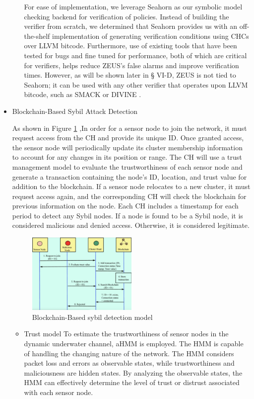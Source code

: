 \begin{itemize}
\begin{itemize}
    \hfill

For ease of implementation, we leverage Seahorn as our symbolic model checking backend for verification of policies. Instead of building the verifier from scratch, we determined that Seahorn provides us with an off-the-shelf implementation of generating 	verification conditions using \ac{CHC}s over \ac{LLVM} bitcode. Furthermore, use of existing tools that have been tested for bugs and fine tuned for performance, both of which are critical for verifiers, helps reduce ZEUS’s false alarms and improve verification times. However, as will be shown later in § VI-D, ZEUS is not tied to Seahorn; it can be used with any other verifier that operates upon \ac{LLVM} bitcode, such as SMACK or DIVINE .
\end{itemize}

\item Blockchain-Based Sybil Attack Detection

As shown in Figure \ref{fig:sybil detection model} ,In order for a sensor node to join the network, it must request access from the \ac{CH} and provide its unique ID. Once granted access, the sensor node will periodically update its cluster membership information to account for any changes in its position or range. The \ac{CH} will use a trust management model to evaluate the trustworthiness of each sensor node and generate a transaction containing the node's ID, location, and trust value for addition to the blockchain. If a sensor node relocates to a new cluster, it must request access again, and the corresponding \ac{CH} will check the blockchain for previous information on the node. Each \ac{CH} includes a timestamp for each period to detect any Sybil nodes. If a node is found to be a Sybil node, it is considered malicious and denied access. Otherwise, it is considered legitimate.
	 

 \begin{figure}[H]
 \centering
  \includegraphics[width=0.5\textwidth]{sybil detection model.png}
  \caption{Blockchain-Based sybil detection model}
  \label{fig:sybil detection model}
\end{figure}
\begin{itemize}
    \item Trust model 
To estimate the trustworthiness of sensor nodes in the dynamic underwater channel, a\ac{HMM} is employed. The \ac{HMM} is capable of handling the changing nature of the network. The \ac{HMM} considers packet loss and errors as observable states, while trustworthiness and maliciousness are hidden states. By analyzing the observable states, the \ac{HMM} can effectively determine the level of trust or distrust associated with each sensor node.
\end{itemize}


\end{itemize}
